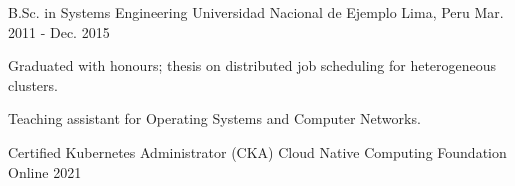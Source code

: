 

\begin{cventries}

  \cventry
    {B.Sc. in Systems Engineering} %
    {Universidad Nacional de Ejemplo} %
    {Lima, Peru} %
    {Mar. 2011 - Dec. 2015} %
    {
      \begin{cvitems} %
        \item {Graduated with honours; thesis on distributed job scheduling for heterogeneous clusters.}
        \item {Teaching assistant for Operating Systems and Computer Networks.}
      \end{cvitems}
    }

  \cventry
    {Certified Kubernetes Administrator (CKA)} %
    {Cloud Native Computing Foundation} %
    {Online} %
    {2021} %
    {}

\end{cventries}
